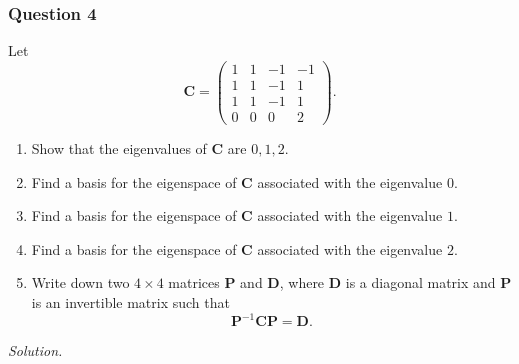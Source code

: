 \documentclass[12pt]{article}
\begin{document}
\subsubsection*{Question 4}
Let 
\[
\mathbf{C} = \begin{pmatrix}
1 &  1 & -1 & -1 \\
1 &  1 & -1 &  1 \\
1 &  1 & -1 &  1 \\
0 &  0 &  0 &  2
\end{pmatrix}.
\]
\begin{enumerate}[label=\textbf{(\alph*)}]
\itemsep 0em
    \item Show that the eigenvalues of \( \mathbf{C} \) are \( 0, 1, 2 \).
    \item Find a basis for the eigenspace of \( \mathbf{C} \) associated with the eigenvalue \( 0 \). 
    \item Find a basis for the eigenspace of \( \mathbf{C} \) associated with the eigenvalue \( 1 \). 
    \item Find a basis for the eigenspace of \( \mathbf{C} \) associated with the eigenvalue \( 2 \). 
    \item Write down two \( 4 \times 4 \) matrices \( \mathbf{P} \) and \( \mathbf{D} \), where \( \mathbf{D} \) is a diagonal matrix and \( \mathbf{P} \) is an invertible matrix such that 
    \[
    \mathbf{P}^{-1}\mathbf{CP} = \mathbf{D}.
    \]
\end{enumerate}
\newpage
\noindent \textit{Solution.}
\end{document}
